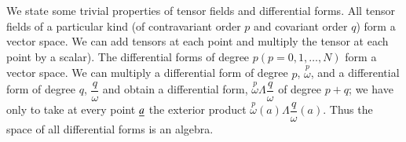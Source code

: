 We state some trivial properties of tensor fields and differential\break
forms. All tensor fields of a particular kind (of contravariant order
$p$ and covariant order $q$) form a vector space. We can add tensors
at each point and multiply the tensor at each point by a scalar).
The differential forms of degree $p(p=0,1,\ldots,N)$ form a vector
space. We can multiply a differential form of degree $p$,
$\overset{p}{\omega}$, and a differential form of degree $q$,
$\dfrac{q}{\omega}$ and obtain a differential form,
$\overset{p}{\omega}\Lambda \dfrac{q}{\omega}$ of degree $p+q$; we
have only to take at every point $\underline{a}$ the exterior product
$\overset{p}{\omega}(a)\Lambda\dfrac{q}{\omega}(a)$. Thus the space of
all differential forms is an algebra.



